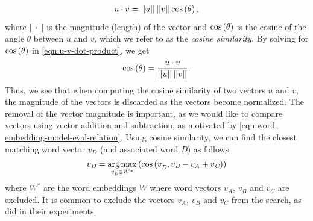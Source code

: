 \begin{align}
    u \cdot v = ||u||\,||v|| \cos\left(\theta\right),
    \label{eqn:u-v-dot-product}
\end{align}
where $||\cdot||$ is the magnitude (length) of the vector and $\cos \left(\theta\right)$ is the cosine of the angle $\theta$ between $u$ and $v$, which we refer to as the \textit{cosine similarity}. By solving for $\cos \left(\theta\right)$ in \cref{eqn:u-v-dot-product}, we get
\begin{align}
    \cos\left(\theta\right) = \frac{u \cdot v}{||u||\,||v||}.
    \label{eqn:cosine-similarity}
\end{align}
Thus, we see that when computing the cosine similarity of two vectors $u$ and $v$, the magnitude of the vectors is discarded as the vectors become normalized. The removal of the vector magnitude is important, as we would like to compare vectors using vector addition and subtraction, as motivated by \cref{eqn:word-embedding-model-eval-relation}. Using cosine similarity, we can find the closest matching word vector $v_{\textit{D}}$ (and associated word \textit{D}) as follows
\begin{align}
    v_{\textit{D}} = \operatorname*{arg\,max}_{v_{\Tilde{\textit{D}}} \in W^*} \left(\cos \left(v_{\Tilde{\textit{D}}}, v_{\textit{B}} - v_{\textit{A}} + v_{\textit{C}}\right)\right)
\end{align}
where $W^*$ are the word embeddings $W$ where word vectors $v_{\textit{A}}$, $v_{\textit{B}}$ and $v_{\textit{C}}$ are excluded. It is common to exclude the vectors $v_{\textit{A}}$, $v_{\textit{B}}$ and $v_{\textit{C}}$ from the search, as \cite{mikolov2013a} did in their experiments.

